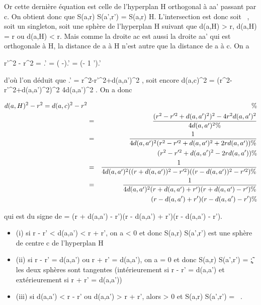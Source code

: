 Or cette dernière équation est celle de l'hyperplan H orthogonal à aa'
passant par c. On obtient donc que S(a,r) \bigcap S(a',r') = S(a,r) \bigcap H.
L'intersection est donc soit \varnothing~, soit un singleton, soit une sphère de
l'hyperplan H suivant que d(a,H) \textgreater{} r, d(a,H) = r ou d(a,H)
\textless{} r. Mais comme la droite ac est aussi la droite aa' qui est
orthogonale à H, la distance de a à H n'est autre que la distance de a à
c. On a

 r'^2 - r^2  =
\overlinebc.\overlineaa' =
(\overlineac
-\overlineab).\overlineaa' =
(\overlineac - 1 
\overlineaa').\overlineaa'

d'où l'on déduit que
\overlineac.\overlineaa' =
r^2-r'^2+d(a,a')^2  , soit encore d(a,c)^2 =
(r^2-r'^2+d(a,a')^2)^2
\over 4d(a,a')^2 . On a donc

\begin{align*} d(a,H)^2 - r^2
= d(a,c)^2 - r^2&& \%&
\\ & =& (r^2 -
r'^2 + d(a,a')^2)^2 -
4r^2d(a,a')^2 \over
4d(a,a')^2 \%& \\ & =& 1
\over 4d(a,a')^2 (r^2 -
r'^2 + d(a,a')^2 + 2rd(a,a')) \%&
\\ & & \quad
(r^2 - r'^2 + d(a,a')^2 - 2rd(a,a'))
\%& \\ & =& 1 \over
4d(a,a')^2 ((r + d(a,a'))^2 -
r'^2)((r - d(a,a'))^2 - r'^2)\%&
\\ & =& 1 \over
4d(a,a')^2 (r + d(a,a') + r')(r + d(a,a') - r') \%&
\\ & & \quad (r - d(a,a')
+ r')(r - d(a,a') - r') \%& \\
\end{align*}

qui est du signe de \delta = (r + d(a,a') - r')(r - d(a,a') + r')(r - d(a,a')
- r').

\begin{itemize}
\itemsep1pt\parskip0pt
\item
  (i) si \textbar{}r - r'\textbar{} \textless{} d(a,a') \textless{} r +
  r', on a \delta \textless{} 0 et donc S(a,r) \bigcap S(a',r') est une sphère de
  centre c de l'hyperplan H
\item
  (ii) si \textbar{}r - r'\textbar{} = d(a,a') ou r + r' = d(a,a'), on a
  \delta = 0 et donc S(a,r) \bigcap S(a',r') =
  \c\~; les deux sphères sont
  tangentes (intérieurement si \textbar{}r - r'\textbar{} = d(a,a') et
  extérieurement si r + r' = d(a,a'))
\item
  (iii) si d(a,a') \textless{} \textbar{}r - r'\textbar{} ou d(a,a')
  \textgreater{} r + r', alors \delta \textgreater{} 0 et S(a,r) \bigcap S(a',r') =
  \varnothing~.
\end{itemize}

